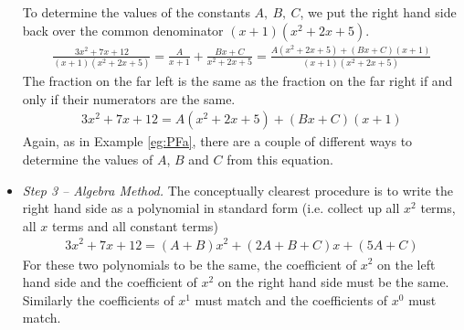 \begin{eg}
\begin{itemize}
To determine the values of the constants
$A,\ B,\ C$, we put the right hand side back over the common denominator
$(x+1)(x^2+2x+5)$.
\begin{align*}
\frac{3x^2+7x+12}{(x+1)(x^2+2x+5)}
=\frac{A}{x+1}+\frac{Bx+C}{x^2+2x+5}
=\frac{A(x^2+2x+5)+(Bx+C)(x+1)}{(x+1)(x^2+2x+5)}
\end{align*}
The fraction on the far left is the same as the fraction on the far right
if and only if their numerators are the same.
\begin{align*}
3x^2+7x+12=A(x^2+2x+5)+(Bx+C)(x+1)
\end{align*}
Again, as in Example \ref{eg:PFa},
there are a couple of different ways to determine the values of $A$, $B$
and $C$ from this equation.


\item\emph{Step 3 -- Algebra Method.}
The conceptually clearest procedure is to write the right hand side as
a polynomial in standard form (i.e. collect up all $x^2$ terms, all $x$
terms and all constant terms)
\begin{align*}
3x^2+7x+12=(A+B)x^2+(2A+B+C)x+(5A+C)
\end{align*}
For these two polynomials to be the same, the coefficient of $x^2$ on the
left hand side and the coefficient of $x^2$ on the right hand side must
be the same. Similarly the coefficients of $x^1$ must match and the
coefficients of $x^0$ must match.


\end{itemize}
\end{eg}
